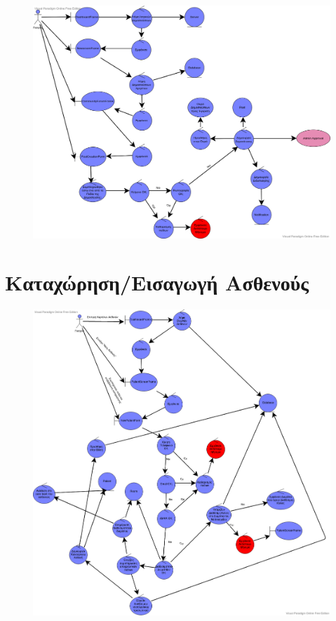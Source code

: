 \documentclass{article}
\begin{document}
\begin{figure}[!htb]
        \centering
        \includegraphics[width=1.1\textwidth]{Create Post.png}
\end{figure}

\newpage

\section{Καταχώρηση/Εισαγωγή Ασθενούς}

\vspace{0.2cm}

\begin{figure}[!htb]
        \centering
        \includegraphics[width=1.1\textwidth]{Patient Insertion.png}
\end{figure}
\end{document}
